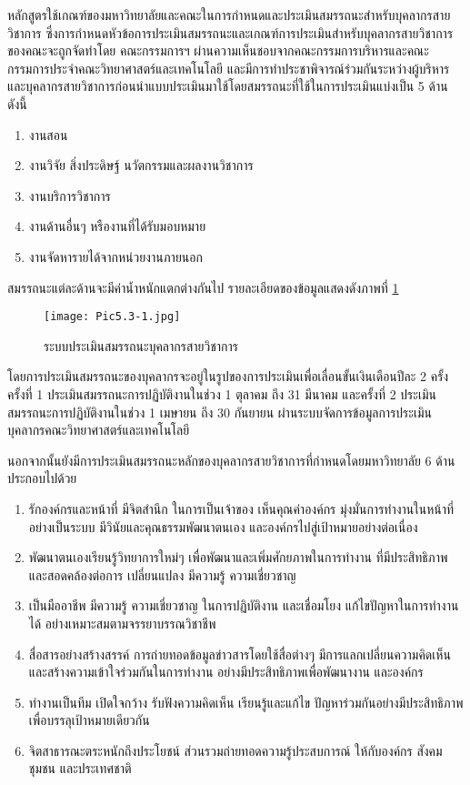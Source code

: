 หลักสูตรใช้เกณฑ์ของมหาวิทยาลัยและคณะในการกำหนดและประเมินสมรรถนะสำหรับบุคลากรสายวิชาการ ซึ่งการกำหนดหัวข้อการประเมินสมรรถนะและเกณฑ์การประเมินสำหรับบุคลากรสายวิชาการของคณะจะถูกจัดทำโดย คณะกรรมการฯ ผ่านความเห็นชอบจากคณะกรรมการบริหารและคณะกรรมการประจำคณะวิทยาศาสตร์และเทคโนโลยี
และมีการทำประชาพิจารณ์ร่วมกันระหว่างผู้บริหารและบุคลากรสายวิชาการก่อนนำแบบประเมินมาใช้โดยสมรรถนะที่ใช้ในการประเมินแบ่งเป็น 5 ด้านดังนี้
\begin{enumerate}
	\item งานสอน
	\item งานวิจัย สิ่งประดิษฐ์ นวัตกรรมและผลงานวิชาการ
	\item งานบริการวิชาการ
	\item งานด้านอื่นๆ หรืองานที่ได้รับมอบหมาย
	\item งานจัดหารายได้จากหน่วยงานภายนอก
\end{enumerate}
สมรรถนะแต่ละด้านจะมีค่าน้ำหนักแตกต่างกันไป รายละเอียดของข้อมูลแสดงดังภาพที่ \ref{Pic5.3-1}\\
\begin{figure}[h!]
	\texttt{[image: Pic5.3-1.jpg]}
	\caption{ระบบประเมินสมรรถนะบุคลากรสายวิชาการ}
	\label{Pic5.3-1}
\end{figure}

โดยการประเมินสมรรถนะของบุคลากรจะอยู่ในรูปของการประเมินเพื่อเลื่อนขั้นเงินเดือนปีละ 2 ครั้ง ครั้งที่ 1 ประเมินสมรรถนะการปฏิบัติงานในช่วง 1 ตุลาคม ถึง 31 มีนาคม และครั้งที่ 2 ประเมินสมรรถนะการปฏิบัติงานในช่วง 1 เมษายน ถึง 30 กันยายน ผ่านระบบจัดการข้อมูลการประเมินบุคลากรคณะวิทยาศาสตร์และเทคโนโลยี 

นอกจากนั้นยังมีการประเมินสมรรถนะหลักของบุคลากรสายวิชาการที่กำหนดโดยมหาวิทยาลัย 6 ด้าน ประกอบไปด้วย
\begin{enumerate}
\item รักองค์กรและหน้าที่ มีจิตสำนึก ในการเป็นเจ้าของ เห็นคุณค่าองค์กร มุ่งมั่นการทำงานในหน้าที่
อย่างเป็นระบบ มีวินัยและคุณธรรมพัฒนาตนเอง และองค์กรไปสู่เป้าหมายอย่างต่อเนื่อง
\item พัฒนาตนเองเรียนรู้วิทยาการใหม่ๆ เพื่อพัฒนาและเพิ่มศักยภาพในการทำงาน ที่มีประสิทธิภาพ
และสอดคล้องต่อการ เปลี่ยนแปลง มีความรู้ ความเชี่ยวชาญ
\item เป็นมืออาชีพ มีความรู้ ความเชี่ยวชาญ ในการปฏิบัติงาน และเชื่อมโยง แก้ไขปัญหาในการทำงาน
ได้ อย่างเหมาะสมตามจรรยาบรรณวิชาชีพ
\item สื่อสารอย่างสร้างสรรค์ การถ่ายทอดข้อมูลข่าวสารโดยใช้สื่อต่างๆ มีการแลกเปลี่ยนความคิดเห็น 
และสร้างความเข้าใจร่วมกันในการทำงาน อย่างมีประสิทธิภาพเพื่อพัฒนางาน และองค์กร
\item ทำงานเป็นทีม เปิดใจกว้าง รับฟังความคิดเห็น เรียนรู้และแก้ไข ปัญหาร่วมกันอย่างมีประสิทธิภาพ 
เพื่อบรรลุเป้าหมายเดียวกัน
\item จิตสาธารณะตระหนักถึงประโยชน์ ส่วนรวมถ่ายทอดความรู้ประสบการณ์ ให้กับองค์กร สังคม
ชุมชน และประเทศชาติ
\end{enumerate}

